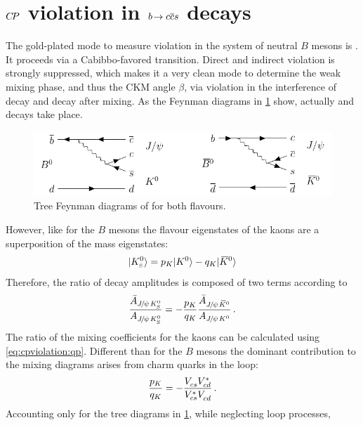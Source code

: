 
\section{\texorpdfstring{${C\!P}$}{CP} violation in \texorpdfstring{${b}\!\rightarrow {\ensuremath{c}}{\ensuremath{\overline {{c}}}}{\ensuremath{s}}$}{bToccbars} decays}
\label{sec:cpviolation:btoccbars}

The gold-plated mode to measure \CP violation in the system of neutral $B$
mesons is \BdToJPsiKS. It proceeds via a Cabibbo-favored \bToccbars
transition. Direct and indirect \CP violation is strongly suppressed, which
makes it a very clean mode to determine the weak mixing phase, and thus the
CKM angle $\beta$, via \CP violation in the interference of decay and decay
after mixing. As the Feynman diagrams in
\cref{fig:cpviolation:bd2jpsiks_feynmans} show, actually
\BdToJPsiKz and \BdbToJPsiKzb decays take place.
\begin{figure}[htb]
\centering
\includegraphics[width=\textwidth]{03-CPViolation/tikz/pdf/BdToJPsiKS_Feynmans.pdf}
\caption{Tree Feynman diagrams of \BdToJPsiKS for both flavours.}
\label{fig:cpviolation:bd2jpsiks_feynmans}
\end{figure}
However, like for the $B$ mesons the flavour eigenstates of the kaons are a
superposition of the \CP mass eigenstates:
\begin{align}
	|{{K}^0_{\mathrm{ \scriptscriptstyle S}}}\rangle = p_K |{{K}^0}\rangle - q_K |{{\kern 0.2em\overline{\kern -0.2em K}{}}{}^0}\rangle
\end{align}
Therefore, the ratio of decay amplitudes is composed of two terms according to
\begin{align}
	\frac{\bar{A}_{{{J\mskip -3mu/\mskip -2mu\psi\mskip 2mu}}{{K}^0_{\mathrm{ \scriptscriptstyle S}}}}}{A_{{{J\mskip -3mu/\mskip -2mu\psi\mskip 2mu}}{{K}^0_{\mathrm{ \scriptscriptstyle S}}}}} = -\frac{p_K}{q_K}\frac{\bar{A}_{{{J\mskip -3mu/\mskip -2mu\psi\mskip 2mu}}{{\kern 0.2em\overline{\kern -0.2em K}{}}{}^0}}}{A_{{{J\mskip -3mu/\mskip -2mu\psi\mskip 2mu}}{{K}^0}}}\,.
\end{align}
The ratio of the mixing coefficients for the kaons can be calculated using
\cref{eq:cpviolation:qp}. Different than for the $B$ mesons the dominant
contribution to the mixing diagrams arises from charm quarks in the loop:
\begin{align}
	\frac{p_K}{q_K} = -\frac{{V_{{c}{s}}^{}}{V_{{c}{d}}^\ast}}{{V_{{c}{s}}^\ast}{V_{{c}{d}}^{}}}\,.
\end{align}
Accounting only for the tree diagrams in
\cref{fig:cpviolation:bd2jpsiks_feynmans}, while neglecting loop processes,
